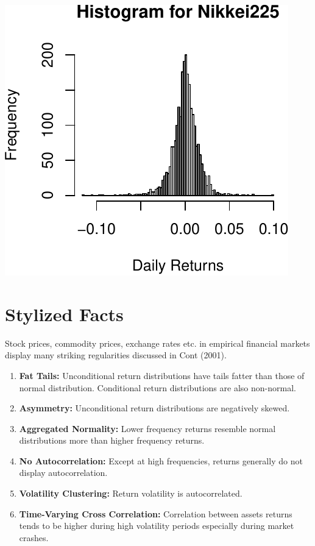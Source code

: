 \documentclass[11pt,]{article}
\providecommand{\tightlist}{%
  \setlength{\itemsep}{0pt}\setlength{\parskip}{0pt}}
\begin{document}
\begin{center}\includegraphics{FMC_T4_PhD_Fin_Time_Series_files/figure-latex/histograms-3} \end{center}

\section{Stylized Facts}\label{stylized-facts}

Stock prices, commodity prices, exchange rates etc. in empirical
financial markets display many striking regularities discussed in Cont
(2001).

\begin{enumerate}
\def\labelenumi{\arabic{enumi}.}
\tightlist
\item
  \textbf{Fat Tails:} Unconditional return distributions have tails
  fatter than those of normal distribution. Conditional return
  distributions are also non-normal.
\item
  \textbf{Asymmetry:} Unconditional return distributions are negatively
  skewed.
\item
  \textbf{Aggregated Normality:} Lower frequency returns resemble normal
  distributions more than higher frequency returns.
\item
  \textbf{No Autocorrelation:} Except at high frequencies, returns
  generally do not display autocorrelation.
\item
  \textbf{Volatility Clustering:} Return volatility is autocorrelated.
\item
  \textbf{Time-Varying Cross Correlation:} Correlation between assets
  returns tends to be higher during high volatility periods especially
  during market crashes.
\end{enumerate}
\end{document}
